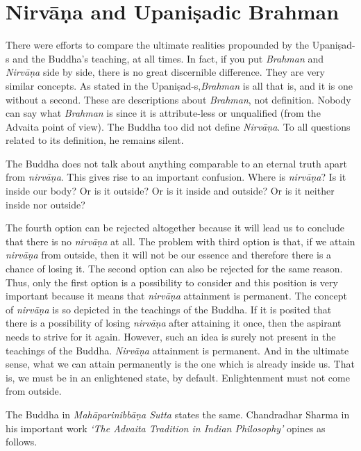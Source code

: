\vspace{-.3cm}

\section*{Nirvāṇa and Upaniṣadic Brahman}

There were efforts to compare the ultimate realities propounded by the Upaniṣad-s and the Buddha’s teaching, at all times. In fact, if you put \textit{Brahman} and \textit{Nirvāṇa} side by side, there is no great discernible difference. They are very similar concepts. As stated in the Upaniṣad-s,\break \textit{Brahman} is all that is, and it is one without a second. These are descriptions about \textit{Brahman}, not definition. Nobody can say what \textit{Brahman} is since it is attribute-less or unqualified (from the Advaita point of view). The Buddha too did not define \textit{Nirvāṇa}. To all questions related to its definition, he remains silent.

The Buddha does not talk about anything comparable to an eternal truth apart from \textit{nirvāṇa}. This gives rise to an important confusion. Where is \textit{nirvāṇa}? Is it inside our body? Or is it outside? Or is it inside and outside? Or is it neither inside nor outside?

The fourth option can be rejected altogether because it will lead us to conclude that there is no \textit{nirvāṇa} at all. The problem with third option is that, if we attain \textit{nirvāṇa} from outside, then it will not be our essence and therefore there is a chance of losing it. The second option can also be rejected for the same reason. Thus, only the first option is a possibility to consider and this position is very important because it means that \textit{nirvāṇa} attainment is permanent. The concept of \textit{nirvāṇa} is so depicted in the teachings of the Buddha. If it is posited that there is a possibility of losing \textit{nirvāṇa} after attaining it once, then the aspirant needs to strive for it again. However, such an idea is surely not present in the teachings of the Buddha. \textit{Nirvāṇa} attainment is permanent. And in the ultimate sense, what we can attain permanently is the one which is already inside us. That is, we must be in an enlightened state, by default. Enlightenment must not come from outside.

The Buddha in \textit{Mahāparinibbāṇa Sutta} states the same. Chandradhar Sharma in his important work \textit{‘The Advaita Tradition in Indian Philosophy’} opines as follows.

